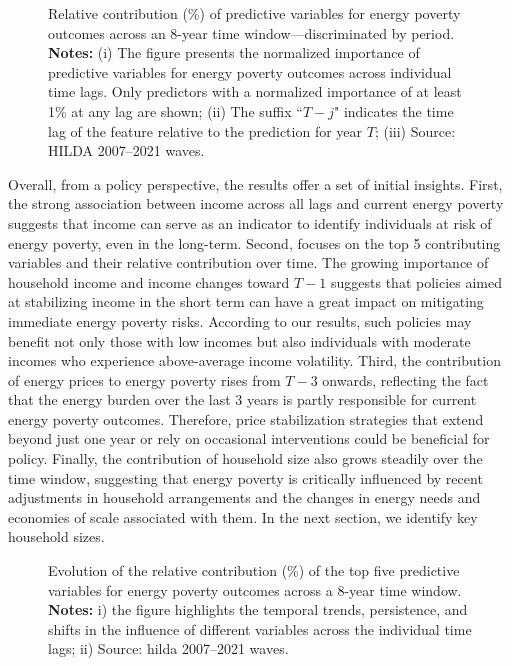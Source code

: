 \documentclass[preprint,authoryear,12pt]{elsarticle}
\begin{document}
\begin{figure}[h!]
\centering
\resizebox{\textwidth}{!}{}
\caption{Relative contribution (\%) of predictive variables for energy poverty outcomes across an 8-year time window—discriminated by period. \\
\small
{\bf Notes:} (i) The figure presents the normalized importance of predictive variables for energy poverty outcomes across individual time lags. Only predictors with a normalized importance of at least 1\% at any lag are shown; (ii) The suffix ``$T-j$" indicates the time lag of the feature relative to the prediction for year $T$; (iii) Source: HILDA 2007--2021 waves.}
\label{fig:figure2}
\end{figure}
Overall, from a policy perspective, the results offer a set of initial insights. First, the strong association between income across all lags and current energy poverty suggests that income can serve as an indicator to identify individuals at risk of energy poverty, even in the long-term. Second,  focuses on the top 5 contributing variables and their relative contribution over time. The growing importance of household income and income changes toward $T-1$ suggests that policies aimed at stabilizing income in the short term can have a great impact on mitigating immediate energy poverty risks. According to our results, such policies may benefit not only those with low incomes but also individuals with moderate incomes who experience above-average income volatility. Third, the contribution of energy prices to energy poverty rises from $T-3$ onwards, reflecting the fact that the energy burden over the last 3 years is partly responsible for current energy poverty outcomes. Therefore, price stabilization strategies that extend beyond just one year or rely on occasional interventions could be beneficial for policy.  Finally, the contribution of household size also grows steadily over the time window, suggesting that energy poverty is critically influenced by recent adjustments in household arrangements and the changes in energy needs and economies of scale associated with them. In the next section, we identify key household sizes. 

\begin{figure}[h!]
\centering
\resizebox{0.85\textwidth}{!}{}
\caption{Evolution of the relative contribution (\%) of the top five predictive variables for energy poverty outcomes across a 8-year time window. \\
\small
{\bf Notes:} i) the figure highlights the temporal trends, persistence, and shifts in the influence of different variables across the individual time lags; ii) Source: \Gls{hilda} 2007--2021 waves.}
\label{fig:figure3}
\end{figure}
\end{document}
